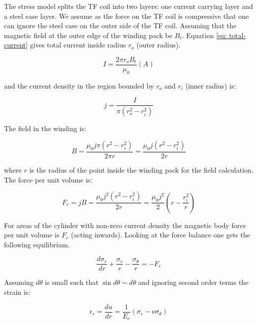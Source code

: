 \documentclass[hidelinks]{article}
\numberwithin{equation}{section}
\begin{document}
    The stress model splits the TF coil into two layers: one current carrying layer and a 
    steel case layer. We assume as the force on the TF coil is compressive that one can 
    ignore the steel case on the outer side of the TF coil. Assuming that the magnetic 
    field at the outer edge of the winding pack be $B_t$. Equation \ref{eq: total-current} 
    gives total current inside radius $r_o$ (outer radius).

    \begin{equation}\label{eq: total-current}
        I = \frac{2\pi r_oB_t}{\mu_0}(A)
    \end{equation}

    \noi and the current density in the region bounded by $r_o$ and $r_i$ (inner radius) is:

    \begin{equation}\label{eq: current-density}
        j = \frac{I}{\pi(r_o^2-r_i^2)}
    \end{equation}

    \noi The field in the winding is:

    \begin{equation}\label{eq: winding-field}
        B = \frac{\mu_0 j\pi(r^2-r_i^2)}{2\pi r} = \frac{\mu_0j(r^2-r_i^2)}{2r}
    \end{equation}

    \noi where $r$ is the radius of the point inside the winding pack for the 
    field calculation. The force per unit volume is:

    \begin{equation} \label{eq: force-per-vol}
        F_r = jB = \frac{\mu_0j^2(r^2 - r_i^2)}{2r} = \frac{\mu_0j^2}{2}(r - \frac{r_i^2}{r})
    \end{equation}

    \noi For areas of the cylinder with non-zero current density the magnetic body 
    force per unit volume is $F_r$ (acting inwards). Looking at the force balance 
    one gets the following equilibrium.

    \begin{equation}\label{eq: force-balance}
        \frac{d\sigma_r}{dr} + \frac{\sigma_r}{r} - \frac{\sigma_{\theta}}{r} = - F_r
    \end{equation}

    \noi Assuming $d\theta$ is small such that $\sin d\theta \sim d\theta$ and ignoring 
    second order terms the strain is:

    \begin{equation}\label{eq: radial-strain}
        \epsilon_r = \frac{du}{dr} = \frac{1}{E_c}(\sigma_r - \nu \sigma_{\theta})
    \end{equation}
\end{document}
